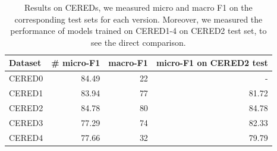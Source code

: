 \begin{table}[h]

\caption{Results on CEREDs, we measured micro and macro F1 on the corresponding test sets for each version. Moreover, we measured the performance of models trained on CERED1-4 on CERED2 test set, to see the direct comparison.}

\label{table:CEREDsResults}

\begin{tabular}{p{} r r r }

\hline
Dataset & \# micro-F1 & macro-F1 & micro-F1 on CERED2 test \\
\hline
\hline
CERED0 & 84.49 & 22 & -\\
CERED1 & 83.94 & 77 & 81.72 \\
CERED2 & 84.78 & 80 & 84.78 \\
CERED3 & 77.29 & 74 & 82.33 \\
CERED4 & 77.66 & 32 & 79.79 \\
\hline


\end{tabular}

\end{table}


